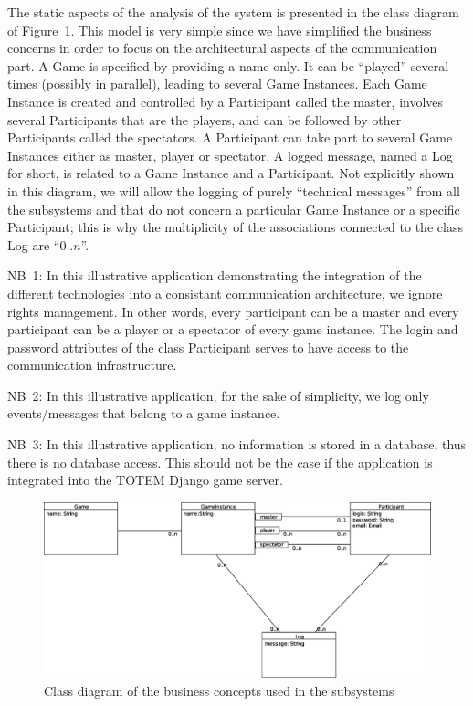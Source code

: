 The static aspects of the analysis of the system is presented in the
class diagram of Figure~\ref{F_integration_class}. This model is very
simple since we have simplified the business concerns in order to
focus on the architectural aspects of the communication part. A \textsf{Game} is
specified by providing a \textsf{name} only. It can be ``played''
several times (possibly in parallel), leading to several
\textsf{Game Instance}s. Each \textsf{Game Instance} is created and
controlled by a \textsf{Participant} called the \textsf{master},
involves several \textsf{Participant}s that are the \textsf{player}s,
and can be followed by other \textsf{Participant}s called the
\textsf{spectator}s. A \textsf{Participant} can take part to several
\textsf{Game Instances} either as \textsf{master}, \textsf{player} or
\textsf{spectator}. A logged message, named a \textsf{Log} for short,
is related to a \textsf{Game Instance} and a \textsf{Participant}. Not
explicitly shown in this diagram, we will allow the logging of purely
``technical messages'' from all the subsystems and that do not concern
a particular \textsf{Game Instance} or a specific
\textsf{Participant}; this is why the multiplicity of the associations
connected to the class \textsf{Log} are ``$0..n$''.

NB~1: In this illustrative application demonstrating the integration of
the different technologies into a consistant communication
architecture, we ignore rights management. In other words, every
participant can be a master and every participant can be a player or a
spectator of every game instance. The \textsf{login} and
\textsf{password} attributes of the class \textsf{Participant} serves
to have access to the communication infrastructure.

NB~2: In this illustrative application, for the sake of simplicity, we
log only events/messages that belong to a game instance.

NB~3: In this illustrative application, no information is stored in a
database, thus there is no database access. This should not be the case
if the application is integrated into the TOTEM \textsf{Django} game
server.

\begin{figure}[htbp!]
\begin{center}
\includegraphics[scale=0.4]{Figures/_integration_class}
\caption{Class diagram of the business concepts used in the subsystems}
\label{F_integration_class}
\end{center}
\end{figure}

